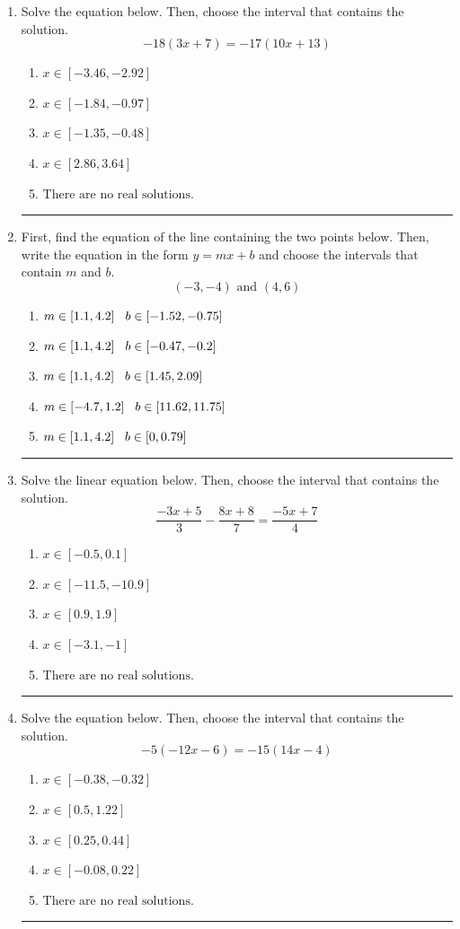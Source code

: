 \documentclass[14pt]{extbook}
\newcommand{\litem}[1]{\item#1\hspace*{-1cm}\rule{\textwidth}{0.4pt}}
\begin{document}
\begin{enumerate}
{\begin{enumerate}[label=\Alph*.]
\end{enumerate} }
\litem{
Solve the equation below. Then, choose the interval that contains the solution.\[ -18(3x + 7) = -17(10x + 13) \]\begin{enumerate}[label=\Alph*.]
\item \( x \in [-3.46, -2.92] \)
\item \( x \in [-1.84, -0.97] \)
\item \( x \in [-1.35, -0.48] \)
\item \( x \in [2.86, 3.64] \)
\item \( \text{There are no real solutions.} \)

\end{enumerate} }
\litem{
First, find the equation of the line containing the two points below. Then, write the equation in the form $ y=mx+b $ and choose the intervals that contain $m$ and $b$.\[ (-3, -4) \text{ and } (4, 6) \]\begin{enumerate}[label=\Alph*.]
\item \( m \in [1.1, 4.2] \hspace*{3mm} b \in [-1.52, -0.75] \)
\item \( m \in [1.1, 4.2] \hspace*{3mm} b \in [-0.47, -0.2] \)
\item \( m \in [1.1, 4.2] \hspace*{3mm} b \in [1.45, 2.09] \)
\item \( m \in [-4.7, 1.2] \hspace*{3mm} b \in [11.62, 11.75] \)
\item \( m \in [1.1, 4.2] \hspace*{3mm} b \in [0, 0.79] \)

\end{enumerate} }
\litem{
Solve the linear equation below. Then, choose the interval that contains the solution.\[ \frac{-3x + 5}{3} - \frac{8x + 8}{7} = \frac{-5x + 7}{4} \]\begin{enumerate}[label=\Alph*.]
\item \( x \in [-0.5, 0.1] \)
\item \( x \in [-11.5, -10.9] \)
\item \( x \in [0.9, 1.9] \)
\item \( x \in [-3.1, -1] \)
\item \( \text{There are no real solutions.} \)

\end{enumerate} }
\litem{
Solve the equation below. Then, choose the interval that contains the solution.\[ -5(-12x -6) = -15(14x -4) \]\begin{enumerate}[label=\Alph*.]
\item \( x \in [-0.38, -0.32] \)
\item \( x \in [0.5, 1.22] \)
\item \( x \in [0.25, 0.44] \)
\item \( x \in [-0.08, 0.22] \)
\item \( \text{There are no real solutions.} \)


\end{enumerate}}
\end{enumerate}
\end{document}
